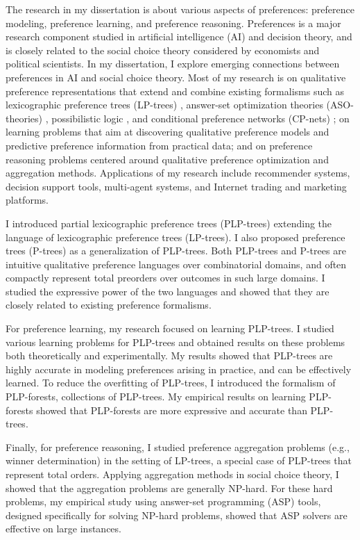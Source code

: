 The research in my dissertation is about various aspects of preferences:
preference modeling, preference learning, and preference reasoning.
Preferences is a major research component studied
in artificial intelligence (AI) and decision theory, and is closely related to the 
social choice theory considered by economists and political scientists. 
In my dissertation, I 
explore emerging connections between preferences in AI and social choice theory. 
Most of my research is on qualitative preference representations 
that extend and combine
existing formalisms such as  
lexicographic preference trees (LP-trees) \cite{booth:learningLP}, 
answer-set optimization theories (ASO-theories) \cite{Brewka:ASO}, 
possibilistic logic \cite{DuboisLP91}, and 
conditional preference networks (CP-nets) \cite{boutilier2004cp};
on learning problems that aim at discovering qualitative preference 
models and predictive preference information from practical data; and on
preference reasoning problems centered around qualitative preference optimization 
and aggregation methods.
Applications of my research include recommender systems, decision support tools,
multi-agent systems, and Internet trading and marketing platforms.

I introduced partial lexicographic preference trees (PLP-trees) extending
the language of lexicographic preference trees (LP-trees).
I also proposed preference trees (P-trees) as a generalization
of PLP-trees.
Both PLP-trees and P-trees are intuitive qualitative preference languages
over combinatorial domains, and often compactly represent total preorders
over outcomes in such large domains.
I studied the expressive power of the two languages and showed that
they are closely related to existing preference formalisms.

For preference learning, my research focused on learning PLP-trees.
I studied various learning problems for PLP-trees and obtained
results on these problems both theoretically and experimentally.
My results showed that PLP-trees are highly accurate in modeling 
preferences arising in
practice, and can be effectively learned.
To reduce the overfitting of PLP-trees, I introduced the formalism
of PLP-forests, collections of PLP-trees.
My empirical results on learning PLP-forests showed that PLP-forests
are more expressive and accurate than PLP-trees.

Finally, for preference reasoning, I studied preference aggregation problems
(e.g., winner determination) in the setting of LP-trees, a special case
of PLP-trees that represent total orders.
Applying aggregation methods in social choice theory, I showed that
the aggregation problems are generally NP-hard.
For these hard problems, my empirical study using answer-set programming
(ASP) tools, designed specifically for solving NP-hard problems, showed
that ASP solvers are effective on large instances.

